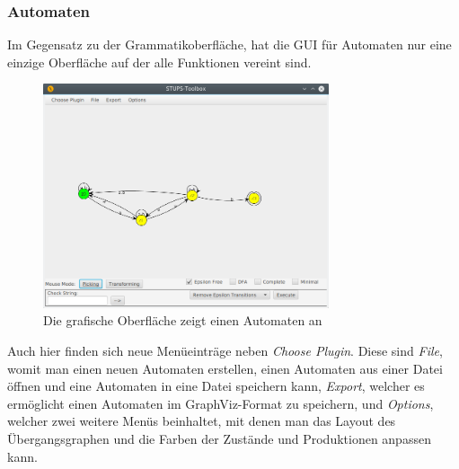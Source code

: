 \subsubsection{Automaten}
\label{sec:2.4.2}
Im Gegensatz zu der Grammatikoberfläche, hat die GUI für Automaten nur eine einzige Oberfläche auf der alle Funktionen vereint sind.
\begin{figure}[H]
	\centering
	\includegraphics[width=0.75\textwidth]{bilder/gui2.png}
	\caption{Die grafische Oberfläche zeigt einen Automaten an}
	\label{fig:pic5}
\end{figure}
Auch hier finden sich neue Menüeinträge neben \textit{Choose Plugin}. Diese sind \textit{File}, womit man einen neuen Automaten erstellen, einen Automaten aus einer Datei öffnen und eine Automaten in eine Datei speichern kann, \textit{Export}, welcher es ermöglicht einen Automaten im GraphViz-Format zu speichern, und \textit{Options}, welcher zwei weitere Menüs beinhaltet, mit denen man das Layout des Übergangsgraphen und die Farben der Zustände und Produktionen anpassen kann.\\
